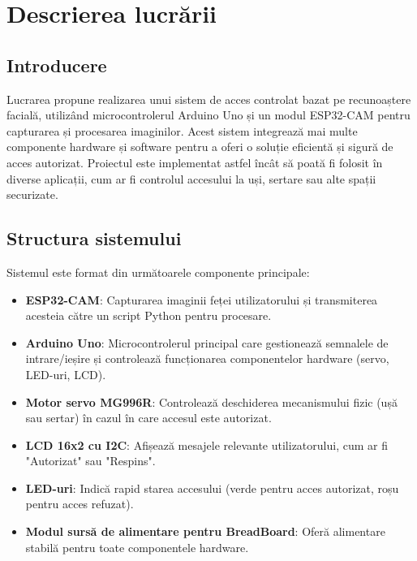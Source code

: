 \documentclass{report}
\begin{document}
\chapter{Descrierea lucrării}

\section{Introducere}
Lucrarea propune realizarea unui sistem de acces controlat bazat pe recunoaștere facială, utilizând microcontrolerul Arduino Uno și un modul ESP32-CAM pentru capturarea și procesarea imaginilor. Acest sistem integrează mai multe componente hardware și software pentru a oferi o soluție eficientă și sigură de acces autorizat. Proiectul este implementat astfel încât să poată fi folosit în diverse aplicații, cum ar fi controlul accesului la uși, sertare sau alte spații securizate.

\section{Structura sistemului}
Sistemul este format din următoarele componente principale:
\begin{itemize}
    \item \textbf{ESP32-CAM}: Capturarea imaginii feței utilizatorului și transmiterea acesteia către un script Python pentru procesare.
    \item \textbf{Arduino Uno}: Microcontrolerul principal care gestionează semnalele de intrare/ieșire și controlează funcționarea componentelor hardware (servo, LED-uri, LCD).
    \item \textbf{Motor servo MG996R}: Controlează deschiderea mecanismului fizic (ușă sau sertar) în cazul în care accesul este autorizat.
    \item \textbf{LCD 16x2 cu I2C}: Afișează mesajele relevante utilizatorului, cum ar fi "Autorizat" sau "Respins".
    \item \textbf{LED-uri}: Indică rapid starea accesului (verde pentru acces autorizat, roșu pentru acces refuzat).
    \item \textbf{Modul sursă de alimentare pentru BreadBoard}: Oferă alimentare stabilă pentru toate componentele hardware.
\end{itemize}
\newpage
\vspace*{1cm}
\end{document}
